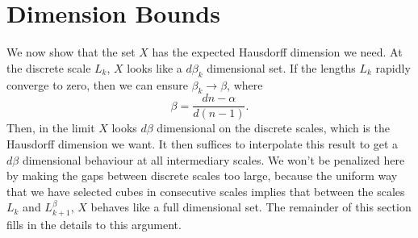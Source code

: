 \documentclass[usenames,dvipsnames]{article}
\theoremstyle{plain}
\theoremstyle{plain}
\begin{document}



%
%

\section{Dimension Bounds}

We now show that the set $X$ has the expected Hausdorff dimension we need. At the discrete scale $L_k$, $X$ looks like a $d \beta_k$ dimensional set. If the lengths $L_k$ rapidly converge to zero, then we can ensure $\beta_k \to \beta$, where
%
\[ \beta = \frac{dn - \alpha}{d(n - 1)}. \]
%
Then, in the limit $X$ looks $d \beta$ dimensional on the discrete scales, which is the Hausdorff dimension we want. It then suffices to interpolate this result to get a $d\beta$ dimensional behaviour at all intermediary scales. We won't be penalized here by making the gaps between discrete scales too large, because the uniform way that we have selected cubes in consecutive scales implies that between the scales $L_k$ and $L_{k+1}^\beta$, $X$ behaves like a full dimensional set. The remainder of this section fills in the details to this argument.
\end{document}
